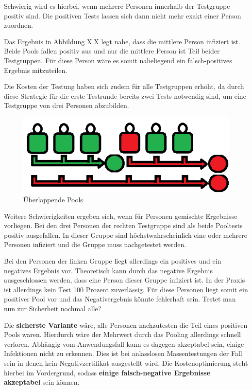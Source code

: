 Schwierig wird es hierbei, wenn mehrere Personen innerhalb der Testgruppe positiv sind.
Die positiven Tests lassen sich dann nicht mehr exakt einer Person zuordnen.

Das Ergebnis in Abbildung X.X legt nahe, dass die mittlere Person infiziert ist.
Beide Pools fallen positiv aus und nur die mittlere Person ist Teil beider Testgruppen.
Für diese Person wäre es somit naheliegend ein falsch-positives Ergebnis mitzuteilen.

Die Kosten der Testung haben sich zudem für alle Testgruppen erhöht, da durch diese Strategie für die erste Testrunde bereits zwei Tests notwendig sind, um eine Testgruppe von drei Personen abzubilden.

\cleardoublepage
\begin{figure}[h]
	\centering
	\includegraphics[width=.8\textwidth]{img/GrossePooluebersicht}
	\caption{Überlappende Pools\footnotemark}
\end{figure}

Weitere Schwierigkeiten ergeben sich, wenn für Personen gemischte Ergebnisse vorliegen.
Bei den drei Personen der rechten Testgruppe sind als beide Pooltests positiv ausgefallen.
In dieser Gruppe sind höchstwahrscheinlich eine oder mehrere Personen infiziert und die Gruppe muss nachgetestet werden.

Bei den Personen der linken Gruppe liegt allerdings ein positives und ein negatives Ergebnis vor.
Theoretisch kann durch das negative Ergebnis ausgeschlossen werden, dass eine Person dieser Gruppe infiziert ist.
In der Praxis ist allerdings kein Test 100 Prozent zuverlässig.
Für diese Personen liegt somit ein positiver Pool vor und das Negativergebnis könnte fehlerhaft sein.
Testet man nun zur Sicherheit nochmal alle?

Die \textbf{sicherste Variante} wäre, alle Personen nachzutesten die Teil eines positiven Pools waren.
Hierdurch wäre der Mehrwert durch das Pooling allerdings schnell verloren.
Abhängig vom Anwendungsfall kann es dagegen akzeptabel sein, einige Infektionen nicht zu erkennen.
Dies ist bei anlasslosen Massentestungen der Fall sein in denen kein Negativzertifikat ausgestellt wird.
Die Kostenoptimierung steht hierbei im Vordergrund, sodass \textbf{einige falsch-negative Ergebnisse akzeptabel} sein können. 

